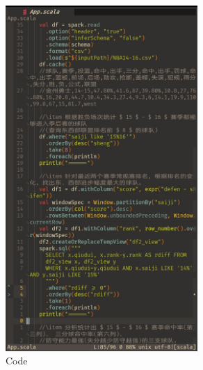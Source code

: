 \documentclass{article}
\begin{document}
\begin{figure}[H]
  \begin{center}
    \includegraphics[width=0.65\textwidth]{./figures/5.jpg}
  \end{center}
  \caption{Code}
\end{figure}
\end{document}
